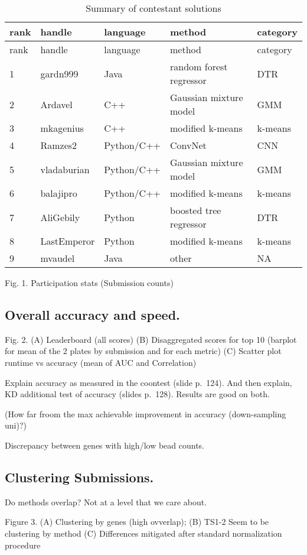 \documentclass[]{article}
\begin{document}
\begin{longtable}[]{@{}lllll@{}}
\caption{Summary of contestant solutions}\tabularnewline
\toprule
rank & handle & language & method & category\tabularnewline
\midrule
\endfirsthead
\toprule
rank & handle & language & method & category\tabularnewline
\midrule
\endhead
1 & gardn999 & Java & random forest regressor & DTR\tabularnewline
2 & Ardavel & C++ & Gaussian mixture model & GMM\tabularnewline
3 & mkagenius & C++ & modified k-means & k-means\tabularnewline
4 & Ramzes2 & Python/C++ & ConvNet & CNN\tabularnewline
5 & vladaburian & Python/C++ & Gaussian mixture model &
GMM\tabularnewline
6 & balajipro & Python/C++ & modified k-means & k-means\tabularnewline
7 & AliGebily & Python & boosted tree regressor & DTR\tabularnewline
8 & LastEmperor & Python & modified k-means & k-means\tabularnewline
9 & mvaudel & Java & other & NA\tabularnewline
\bottomrule
\end{longtable}

Fig. 1. Participation stats (Submission counts)

\hypertarget{overall-accuracy-and-speed.}{%
\subsection{Overall accuracy and
speed.}\label{overall-accuracy-and-speed.}}

Fig. 2. (A) Leaderboard (all scores) (B) Disaggregated scores for top 10
(barplot for mean of the 2 plates by submission and for each metric) (C)
Scatter plot runtime vs accuracy (mean of AUC and Correlation)

Explain accuracy as measured in the coontest (slide p.~124). And then
explain, KD additional test of accuracy (slides p.~128). Results are
good on both.

(How far froom the max achievable improvement in accuracy (down-sampling
uni)?)

Discrepancy between genes with high/low bead counts.

\hypertarget{clustering-submissions.}{%
\subsection{Clustering Submissions.}\label{clustering-submissions.}}

Do methods overlap? Not at a level that we care about.

Figure 3. (A) Clustering by genes (high ovverlap); (B) TS1-2 Seem to be
clustering by method (C) Differences mitigated after standard
normalization procedure
\end{document}
